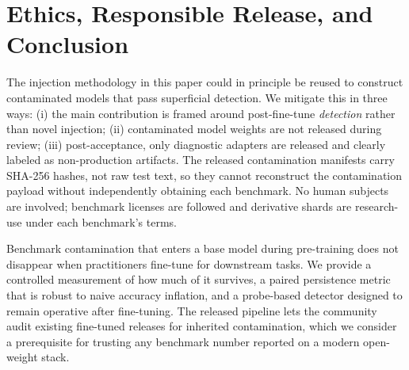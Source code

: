 \documentclass{article}
\begin{document}
\section{Ethics, Responsible Release, and Conclusion}
\label{sec:ethics}
\label{sec:conclusion}

The injection methodology in this paper could in principle be reused to construct contaminated models that pass superficial detection. We mitigate this in three ways: (i) the main contribution is framed around post-fine-tune \emph{detection} rather than novel injection; (ii) contaminated model weights are not released during review; (iii) post-acceptance, only diagnostic adapters are released and clearly labeled as non-production artifacts. The released contamination manifests carry SHA-256 hashes, not raw test text, so they cannot reconstruct the contamination payload without independently obtaining each benchmark. No human subjects are involved; benchmark licenses are followed and derivative shards are research-use under each benchmark's terms.

Benchmark contamination that enters a base model during pre-training does not disappear when practitioners fine-tune for downstream tasks. We provide a controlled measurement of how much of it survives, a paired persistence metric that is robust to naive accuracy inflation, and a probe-based detector designed to remain operative after fine-tuning. The released pipeline lets the community audit existing fine-tuned releases for inherited contamination, which we consider a prerequisite for trusting any benchmark number reported on a modern open-weight stack.




\appendix
\end{document}
